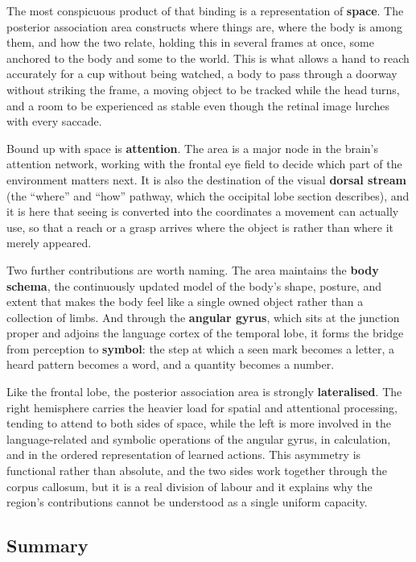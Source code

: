 \documentclass[11pt]{article}
\begin{document}
The most conspicuous product of that binding is a representation of \textbf{space}. The posterior association area constructs where things are, where the body is among them, and how the two relate, holding this in several frames at once, some anchored to the body and some to the world. This is what allows a hand to reach accurately for a cup without being watched, a body to pass through a doorway without striking the frame, a moving object to be tracked while the head turns, and a room to be experienced as stable even though the retinal image lurches with every saccade.

Bound up with space is \textbf{attention}. The area is a major node in the brain's attention network, working with the frontal eye field to decide which part of the environment matters next. It is also the destination of the visual \textbf{dorsal stream} (the ``where'' and ``how'' pathway, which the occipital lobe section describes), and it is here that seeing is converted into the coordinates a movement can actually use, so that a reach or a grasp arrives where the object is rather than where it merely appeared.

Two further contributions are worth naming. The area maintains the \textbf{body schema}, the continuously updated model of the body's shape, posture, and extent that makes the body feel like a single owned object rather than a collection of limbs. And through the \textbf{angular gyrus}, which sits at the junction proper and adjoins the language cortex of the temporal lobe, it forms the bridge from perception to \textbf{symbol}: the step at which a seen mark becomes a letter, a heard pattern becomes a word, and a quantity becomes a number.

Like the frontal lobe, the posterior association area is strongly \textbf{lateralised}. The right hemisphere carries the heavier load for spatial and attentional processing, tending to attend to both sides of space, while the left is more involved in the language-related and symbolic operations of the angular gyrus, in calculation, and in the ordered representation of learned actions. This asymmetry is functional rather than absolute, and the two sides work together through the corpus callosum, but it is a real division of labour and it explains why the region's contributions cannot be understood as a single uniform capacity.

\subsection{Summary}
\end{document}
